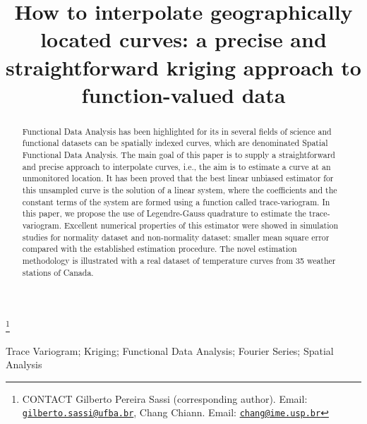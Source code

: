 \documentclass[]{interact}
\theoremstyle{plain}%
\theoremstyle{definition}
\theoremstyle{remark}
\begin{document}

\title{How to interpolate geographically located curves: a precise and straightforward kriging approach to function-valued data}


\author{
}

\thanks{CONTACT Gilberto Pereira Sassi (corresponding author). Email: \href{mailto:gilberto.sassi@ufba.br}{\nolinkurl{gilberto.sassi@ufba.br}}, Chang Chiann. Email: \href{mailto:chang@ime.usp.br}{\nolinkurl{chang@ime.usp.br}}}

\maketitle

\begin{abstract}
Functional Data Analysis has been highlighted for its in several fields of science and functional datasets can be spatially indexed curves, which are denominated Spatial Functional Data Analysis. The main goal of this paper is to supply a straightforward and precise approach to interpolate curves, i.e., the aim is to estimate a curve at an unmonitored location. It has been proved that the best linear unbiased estimator for this unsampled curve is the solution of a linear system, where the coefficients and the constant terms of the system are formed using a function called trace-variogram. In this paper, we propose the use of Legendre-Gauss quadrature to estimate the trace-variogram. Excellent numerical properties of this estimator were showed in simulation studies for normality dataset and non-normality dataset: smaller mean square error compared with the established estimation procedure. The novel estimation methodology is illustrated with a real dataset of temperature curves from 35 weather stations of Canada.
\end{abstract}

\begin{keywords}
Trace Variogram; Kriging; Functional Data Analysis; Fourier Series; Spatial Analysis
\end{keywords}

\maketitle
\end{document}
